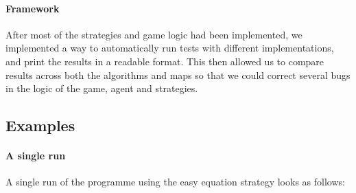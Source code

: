 \documentclass[british]{article}
\begin{document}
\paragraph{Framework} After most of the strategies and game logic had been implemented, we implemented a way to automatically run tests with different implementations, and print the results in a readable format. This then allowed us to compare results across both the algorithms and maps so that we could correct several bugs in the logic of the game, agent and strategies.
\subsection{Examples}
\label{example}
\paragraph{A single run} A single run of the programme using the easy equation strategy looks as follows:
\end{document}
